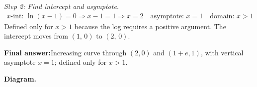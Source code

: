 \documentclass[11pt]{article}
\begin{document}
\textit{Step 2: Find intercept and asymptote.}
\[\begin{gathered}
x\text{-int: } \ln(x-1) = 0 \Rightarrow x - 1 = 1 \Rightarrow x = 2 \quad \text{asymptote: } x = 1 \quad \text{domain: } x > 1
\end{gathered}\]
Defined only for \( x > 1 \) because the log requires a positive argument. The intercept moves from \( (1,\,0) \) to \( (2,\,0) \).

\begin{answerbox}
\textbf{Final answer:}\quad Increasing curve through \(\displaystyle (2, 0)\) and \(\displaystyle (1+e, 1)\), with vertical asymptote \(\displaystyle  x = 1 \); defined only for \(\displaystyle  x > 1 \).
\end{answerbox}
\textbf{Diagram.}

\begin{center}
\end{center}
\end{document}
